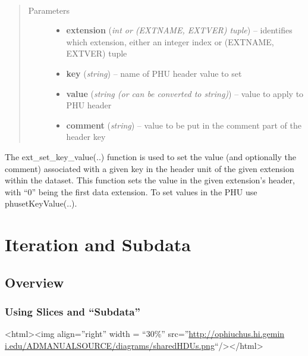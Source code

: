 \documentclass[letterpaper,10pt,english]{sphinxmanual}
\begin{document}
\begin{fulllineitems}
\label{chapter_AstroDataClass:astrodata.data.AstroData.ext_set_key_value}~\begin{quote}\begin{description}
\item[{Parameters}] \leavevmode\begin{itemize}
\item {} 
\textbf{extension} (\emph{int or (EXTNAME, EXTVER) tuple}) -- identifies which extension, either an integer index 
or (EXTNAME, EXTVER) tuple

\item {} 
\textbf{key} (\emph{string}) -- name of PHU header value to set

\item {} 
\textbf{value} (\emph{string (or can be converted to string)}) -- value to apply to PHU header

\item {} 
\textbf{comment} (\emph{string}) -- value to be put in the comment part of the header key

\end{itemize}

\end{description}\end{quote}

The ext\_set\_key\_value(..) function is used to set the value (and optionally
the comment) associated with a given key in the header unit of the given
extension within the dataset. This function sets the value in the
given extension's header, with ``0'' being the first data extension.  To
set values in the PHU use phusetKeyValue(..).

\end{fulllineitems}



\section{Iteration and Subdata}
\label{chapter_AstroDataClass:iteration-and-subdata}

\subsection{Overview}
\label{chapter_AstroDataClass:overview}

\subsubsection{Using Slices and ``Subdata''}
\label{gen.ADMANUAL-ADSubdata:using-slices-and-subdata}\label{gen.ADMANUAL-ADSubdata::doc}
\textless{}html\textgreater{}\textless{}img align=''right'' width = ``30\%'' src=''\href{http://ophiuchus.hi.gemini.edu/ADMANUALSOURCE/diagrams/sharedHDUs.png}{http://ophiuchus.hi.gemin
i.edu/ADMANUALSOURCE/diagrams/sharedHDUs.png}``/\textgreater{}\textless{}/html\textgreater{}
\end{document}
